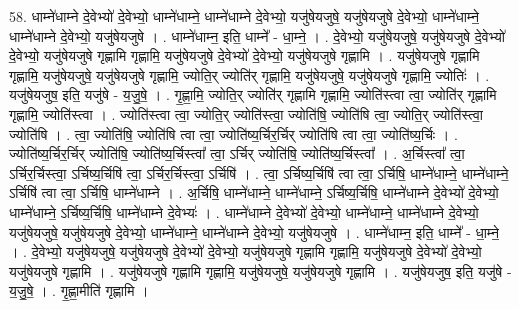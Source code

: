 \documentclass[17pt]{extarticle}
\begin{document}
58. धाम्ने॑धाम्ने दे॒वेभ्यो॑ दे॒वेभ्यो॒ धाम्ने॑धाम्ने॒ धाम्ने॑धाम्ने दे॒वेभ्यो॒ यजु॑षेयजुषे॒ यजु॑षेयजुषे दे॒वेभ्यो॒ धाम्ने॑धाम्ने॒ धाम्ने॑धाम्ने दे॒वेभ्यो॒ यजु॑षेयजुषे । . धाम्ने॑धाम्न॒ इति॒ धाम्ने᳚ - धा॒म्ने॒ । . दे॒वेभ्यो॒ यजु॑षेयजुषे॒ यजु॑षेयजुषे दे॒वेभ्यो॑ दे॒वेभ्यो॒ यजु॑षेयजुषे गृह्णामि गृह्णामि॒ यजु॑षेयजुषे दे॒वेभ्यो॑ दे॒वेभ्यो॒ यजु॑षेयजुषे गृह्णामि । . यजु॑षेयजुषे गृह्णामि गृह्णामि॒ यजु॑षेयजुषे॒ यजु॑षेयजुषे गृह्णामि॒ ज्योति॒र् ज्योति॑र् गृह्णामि॒ यजु॑षेयजुषे॒ यजु॑षेयजुषे गृह्णामि॒ ज्योतिः॑ । . यजु॑षेयजुष॒ इति॒ यजु॑षे - य॒जु॒षे॒ । . गृ॒ह्णा॒मि॒ ज्योति॒र् ज्योति॑र् गृह्णामि गृह्णामि॒ ज्योति॑स्त्वा त्वा॒ ज्योति॑र् गृह्णामि गृह्णामि॒ ज्योति॑स्त्वा । . ज्योति॑स्त्वा त्वा॒ ज्योति॒र् ज्योति॑स्त्वा॒ ज्योति॑षि॒ ज्योति॑षि त्वा॒ ज्योति॒र् ज्योति॑स्त्वा॒ ज्योति॑षि । . त्वा॒ ज्योति॑षि॒ ज्योति॑षि त्वा त्वा॒ ज्योति॑ष्य॒र्चिर॒र्चिर् ज्योति॑षि त्वा त्वा॒ ज्योति॑ष्य॒र्चिः । . ज्योति॑ष्य॒र्चिर॒र्चिर् ज्योति॑षि॒ ज्योति॑ष्य॒र्चिस्त्वा᳚ त्वा॒ ऽर्चिर् ज्योति॑षि॒ ज्योति॑ष्य॒र्चिस्त्वा᳚ । . अ॒र्चिस्त्वा᳚ त्वा॒ ऽर्चिर॒र्चिस्त्वा॒ ऽर्चिष्य॒र्चिषि॑ त्वा॒ ऽर्चिर॒र्चिस्त्वा॒ ऽर्चिषि॑ । . त्वा॒ ऽर्चिष्य॒र्चिषि॑ त्वा त्वा॒ ऽर्चिषि॒ धाम्ने॑धाम्ने॒ धाम्ने॑धाम्ने॒ ऽर्चिषि॑ त्वा त्वा॒ ऽर्चिषि॒ धाम्ने॑धाम्ने । . अ॒र्चिषि॒ धाम्ने॑धाम्ने॒ धाम्ने॑धाम्ने॒ ऽर्चिष्य॒र्चिषि॒ धाम्ने॑धाम्ने दे॒वेभ्यो॑ दे॒वेभ्यो॒ धाम्ने॑धाम्ने॒ ऽर्चिष्य॒र्चिषि॒ धाम्ने॑धाम्ने दे॒वेभ्यः॑ । . धाम्ने॑धाम्ने दे॒वेभ्यो॑ दे॒वेभ्यो॒ धाम्ने॑धाम्ने॒ धाम्ने॑धाम्ने दे॒वेभ्यो॒ यजु॑षेयजुषे॒ यजु॑षेयजुषे दे॒वेभ्यो॒ धाम्ने॑धाम्ने॒ धाम्ने॑धाम्ने दे॒वेभ्यो॒ यजु॑षेयजुषे । . धाम्ने॑धाम्न॒ इति॒ धाम्ने᳚ - धा॒म्ने॒ । . दे॒वेभ्यो॒ यजु॑षेयजुषे॒ यजु॑षेयजुषे दे॒वेभ्यो॑ दे॒वेभ्यो॒ यजु॑षेयजुषे गृह्णामि गृह्णामि॒ यजु॑षेयजुषे दे॒वेभ्यो॑ दे॒वेभ्यो॒ यजु॑षेयजुषे गृह्णामि । . यजु॑षेयजुषे गृह्णामि गृह्णामि॒ यजु॑षेयजुषे॒ यजु॑षेयजुषे गृह्णामि । . यजु॑षेयजुष॒ इति॒ यजु॑षे - य॒जु॒षे॒ । . गृ॒ह्णा॒मीति॑ गृह्णामि । \newline
\pagebreak
{}
\end{document}
